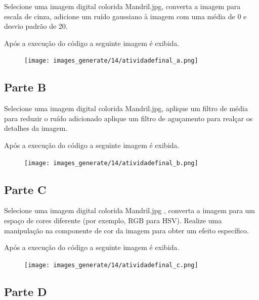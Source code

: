 \documentclass[10pt,a4paper]{article}
\begin{document}
Selecione uma imagem digital colorida Mandril.jpg, converta a imagem para escala de cinza, adicione um ruído gaussiano à imagem com uma média de 0 e desvio padrão de 20. 



Após a execução do código a seguinte imagem é exibida.

\begin{figure}[H]
    \centering
    {{\texttt{[image: images\_generate/14/atividadefinal\_a.png]}}}
\end{figure}

\subsection{Parte B}

Selecione uma imagem digital colorida Mandril.jpg, aplique um filtro de média para reduzir o ruído adicionado aplique um filtro de aguçamento para realçar os detalhes da imagem. 



Após a execução do código a seguinte imagem é exibida.

\begin{figure}[H]
    \centering
    {{\texttt{[image: images\_generate/14/atividadefinal\_b.png]}}}
\end{figure}

\subsection{Parte C}

Selecione uma imagem digital colorida Mandril.jpg , converta a imagem para um espaço de cores diferente (por exemplo, RGB para HSV). Realize uma manipulação na componente de cor da imagem para obter um efeito específico. 



Após a execução do código a seguinte imagem é exibida.

\begin{figure}[H]
    \centering
    {{\texttt{[image: images\_generate/14/atividadefinal\_c.png]}}}
\end{figure}

\subsection{Parte D}
\end{document}
